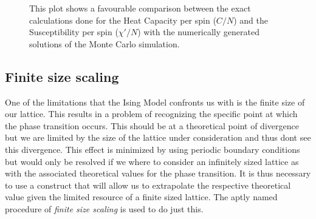 \documentclass[a4paper]{article}
\begin{document}
\begin{figure}[htb]
  \centering 
  \caption[hjsagh]{This plot shows a favourable comparison between the exact
    calculations done for the Heat Capacity per spin ($C/N$) and the
    Susceptibility per spin ($\chi'/N$)
    with the numerically generated solutions of the Monte Carlo simulation.}\label{fig:Exact}
\end{figure}

 


\subsection{Finite size scaling}\label{sec:finite-size-scaling}

One of the limitations that the Ising Model confronts us with is the
finite size of our lattice. This results in a problem of recognizing
the specific point at which the phase transition occurs. This should be at a theoretical point of divergence but we are limited by the size of the lattice under consideration and thus dont see this divergence.
This effect is minimized by using periodic boundary conditions but
would only be resolved if we where to consider an infinitely sized
lattice as with the associated theoretical values for the phase
transition. It is thus necessary to use a construct
that will allow us to extrapolate the respective theoretical value
given the limited resource of a finite sized lattice. The aptly named
procedure of \emph{finite size scaling} is used to do just this.
\end{document}
